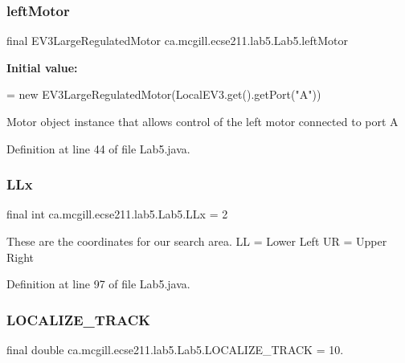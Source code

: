 \subsubsection{\texorpdfstring{left\+Motor}{leftMotor}}
{\footnotesize\ttfamily final E\+V3\+Large\+Regulated\+Motor ca.\+mcgill.\+ecse211.\+lab5.\+Lab5.\+left\+Motor\hspace{0.3cm}{\ttfamily [static]}}

{\bfseries Initial value\+:}
\begin{DoxyCode}
=
      \textcolor{keyword}{new} EV3LargeRegulatedMotor(LocalEV3.get().getPort(\textcolor{stringliteral}{"A"}))
\end{DoxyCode}
Motor object instance that allows control of the left motor connected to port A 

Definition at line 44 of file Lab5.\+java.

\mbox{\label{classca_1_1mcgill_1_1ecse211_1_1lab5_1_1_lab5_a957a526ed669e9d8b7fc485e21385ee9}} 
\subsubsection{\texorpdfstring{L\+Lx}{LLx}}
{\footnotesize\ttfamily final int ca.\+mcgill.\+ecse211.\+lab5.\+Lab5.\+L\+Lx = 2\hspace{0.3cm}{\ttfamily [static]}}

These are the coordinates for our search area. LL = Lower Left UR = Upper Right 

Definition at line 97 of file Lab5.\+java.

\mbox{\label{classca_1_1mcgill_1_1ecse211_1_1lab5_1_1_lab5_a971cb3d8a46c2b41bcadf08f21498d6d}} 
\subsubsection{\texorpdfstring{L\+O\+C\+A\+L\+I\+Z\+E\+\_\+\+T\+R\+A\+CK}{LOCALIZE\_TRACK}}
{\footnotesize\ttfamily final double ca.\+mcgill.\+ecse211.\+lab5.\+Lab5.\+L\+O\+C\+A\+L\+I\+Z\+E\+\_\+\+T\+R\+A\+CK = 10.\hspace{0.3cm}{\ttfamily [static]}}

